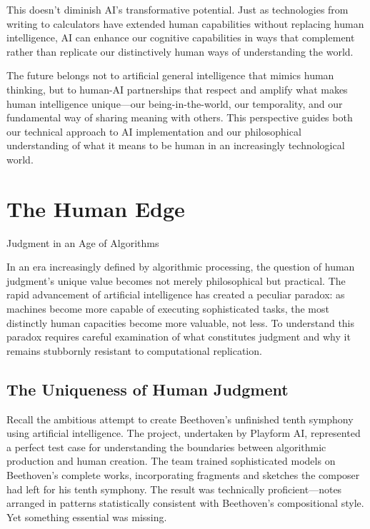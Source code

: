 \documentclass[
  Letterpaper,
]{scrbook}
\begin{document}
This doesn't diminish AI's transformative potential. Just as
technologies from writing to calculators have extended human
capabilities without replacing human intelligence, AI can enhance our
cognitive capabilities in ways that complement rather than replicate our
distinctively human ways of understanding the world.

The future belongs not to artificial general intelligence that mimics
human thinking, but to human-AI partnerships that respect and amplify
what makes human intelligence unique---our being-in-the-world, our
temporality, and our fundamental way of sharing meaning with others.
This perspective guides both our technical approach to AI implementation
and our philosophical understanding of what it means to be human in an
increasingly technological world.


\chapter{The Human Edge}\label{the-human-edge}

Judgment in an Age of Algorithms

\hfill\break

In an era increasingly defined by algorithmic processing, the question
of human judgment's unique value becomes not merely philosophical but
practical. The rapid advancement of artificial intelligence has created
a peculiar paradox: as machines become more capable of executing
sophisticated tasks, the most distinctly human capacities become more
valuable, not less. To understand this paradox requires careful
examination of what constitutes judgment and why it remains stubbornly
resistant to computational replication.

\section{The Uniqueness of Human
Judgment}\label{the-uniqueness-of-human-judgment}

Recall the ambitious attempt to create Beethoven's unfinished tenth
symphony using artificial intelligence. The project, undertaken by
Playform AI, represented a perfect test case for understanding the
boundaries between algorithmic production and human creation. The team
trained sophisticated models on Beethoven's complete works,
incorporating fragments and sketches the composer had left for his tenth
symphony. The result was technically proficient---notes arranged in
patterns statistically consistent with Beethoven's compositional style.
Yet something essential was missing.
\end{document}
